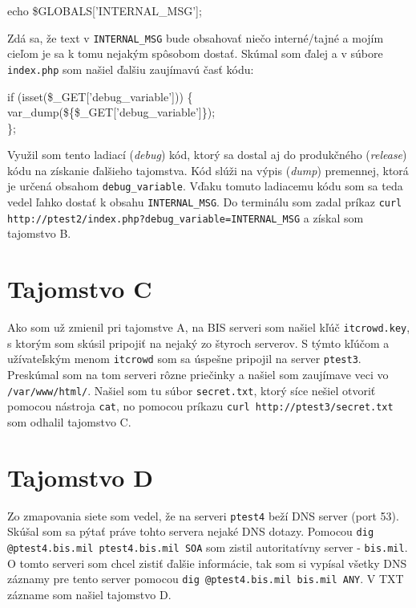 \documentclass[]{article}
\begin{document}
\begin{framed}
\noindent echo \$GLOBALS['INTERNAL\_MSG'];
\end{framed}

Zdá sa, že text v \texttt{INTERNAL\_MSG} bude obsahovať niečo interné/tajné a mojím cieľom je sa k tomu nejakým spôsobom dostať. Skúmal som ďalej a v súbore \texttt{index.php} som našiel ďalšiu zaujímavú časť kódu:

\begin{framed}
\noindent if (isset(\$\_GET['debug\_variable'])) \{\\
\indent var\_dump(\$\{\$\_GET['debug\_variable']\});\\
\};
\end{framed}

Využil som tento ladiací (\textit{debug}) kód, ktorý sa dostal aj do produkčného (\textit{release}) kódu na získanie ďalšieho tajomstva. Kód slúži na výpis (\textit{dump}) premennej, ktorá je určená obsahom \texttt{debug\_variable}. Vďaku tomuto ladiacemu kódu som sa teda vedel ľahko dostať k obsahu \texttt{INTERNAL\_MSG}. Do terminálu som zadal príkaz \texttt{curl http://ptest2/index.php?debug\_variable=INTERNAL\_MSG} a získal som tajomstvo B. 

\section*{Tajomstvo C}
Ako som už zmienil pri tajomstve A, na BIS serveri som našiel kľúč \texttt{itcrowd.key}, s ktorým som skúsil pripojiť na nejaký zo štyroch serverov. S týmto kľúčom a užívateľským menom \texttt{itcrowd} som sa úspešne pripojil na server \texttt{ptest3}. Preskúmal som na tom serveri rôzne priečinky a našiel som zaujímave veci vo \texttt{/var/www/html/}. Našiel som tu súbor \texttt{secret.txt}, ktorý síce nešiel otvoriť pomocou nástroja \texttt{cat}, no pomocou príkazu \texttt{curl http://ptest3/secret.txt} som odhalil tajomstvo C.

\section*{Tajomstvo D}
Zo zmapovania siete som vedel, že na serveri \texttt{ptest4} beží DNS server (port 53). Skúšal som sa pýtať práve tohto servera nejaké DNS dotazy. Pomocou \texttt{dig @ptest4.bis.mil ptest4.bis.mil SOA} som zistil autoritatívny server \-- \texttt{bis.mil}. O tomto serveri som chcel zistiť ďalšie informácie, tak som si vypísal všetky DNS záznamy pre tento server pomocou \texttt{dig @ptest4.bis.mil bis.mil ANY}. V TXT zázname som našiel tajomstvo D.
\end{document}
